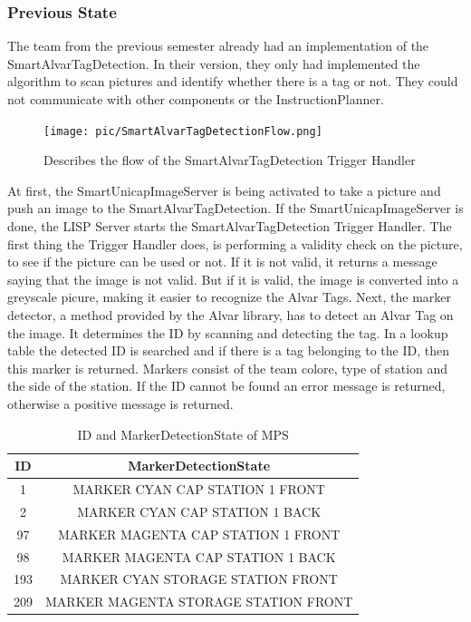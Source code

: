 \subsubsection{Previous State}

The team from the previous semester already had an implementation of the SmartAlvarTagDetection. In their version, they only had implemented the algorithm to scan pictures and identify whether there is a tag or not. They could not communicate with other components or the InstructionPlanner. \\

\begin{figure}[h]
\centering
\texttt{[image: pic/SmartAlvarTagDetectionFlow.png]}
\caption{Describes the flow of the SmartAlvarTagDetection Trigger Handler}
\label{fig:smartAlvarFlow}
\end{figure}


At first, the SmartUnicapImageServer is being activated to take a picture and push an image to the SmartAlvarTagDetection. If the SmartUnicapImageServer is done, the LISP Server starts the SmartAlvarTagDetection Trigger Handler. The first thing the Trigger Handler does, is performing a validity check on the picture, to see if the picture can be used or not. If it is not valid, it returns a message saying that the image is not valid. But if it is valid, the image is converted into a greyscale picure, making it easier to recognize the Alvar Tags. Next, the marker detector, a method provided by the Alvar library, has to detect an Alvar Tag on the image. It determines the ID by scanning and detecting the tag. In a lookup table the detected ID is searched and if there is a tag belonging to the ID, then this marker is returned. Markers consist of the team colore, type of station and the side of the station. If the ID cannot be found an error message is returned, otherwise a positive message is returned. \\

\begin {table}[h]
\caption{ID and MarkerDetectionState of MPS}
\label{tab:alvar_mps}
\begin{center}

 \begin{tabular}{|c | c|}
 \hline
 ID & MarkerDetectionState \\ [0.5ex] 
 \hline\hline
 1 & MARKER CYAN CAP STATION 1 FRONT \\ 
 \hline
 2 & MARKER CYAN CAP STATION 1 BACK \\
 \hline
 97 & MARKER MAGENTA CAP STATION 1 FRONT \\
 \hline
 98 & MARKER MAGENTA CAP STATION 1 BACK \\
 \hline
 193 & MARKER CYAN STORAGE STATION FRONT \\ [1ex] 
 \hline
 209 & MARKER MAGENTA STORAGE STATION FRONT \\ [1ex] 
 \hline
\end{tabular}
\end{center}
\end{table}

